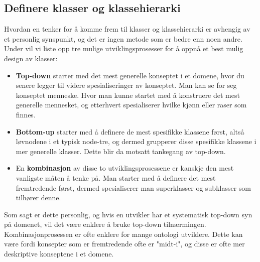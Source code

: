 \subsection{Definere klasser og klassehierarki}
Hvordan en tenker for å komme frem til klasser og klassehierarki er avhengig av et personlig synspunkt, og det er ingen metode som er bedre enn noen andre. Under vil vi liste opp tre mulige utviklingsprosesser for å oppnå et best mulig design av klasser:
\begin{itemize}
\item \textbf{Top-down} starter med det mest generelle konseptet i et domene, hvor du senere legger til videre spesialiseringer av konseptet. Man kan se for seg konseptet menneske. Hvor man kunne startet med å konstruere det mest generelle mennesket, og etterhvert spesialiserer hvilke kjønn eller raser som finnes.
\item \textbf{Bottom-up} starter med å definere de mest spesifikke klassene først, altså løvnodene i et typisk node-tre, og dermed grupperer disse spesifikke klassene i mer generelle klasser. Dette blir da motsatt tankegang av top-down.
\item En \textbf{kombinasjon} av disse to utviklingsprosessene er kanskje den mest vanligste måten å tenke på. Man starter med å definere det mest fremtredende først, dermed spesialiserer man superklasser og subklasser som tilhører denne. \\

\end{itemize}
Som sagt er dette personlig, og hvis en utvikler har et systematisk top-down syn på domenet, vil det være enklere å bruke top-down tilnærmingen. Kombinasjonprosessen er ofte enklere for mange ontologi utviklere. Dette kan være fordi konsepter som er fremtredende ofte er "midt-i", og disse er ofte mer deskriptive konseptene i et domene. \\

